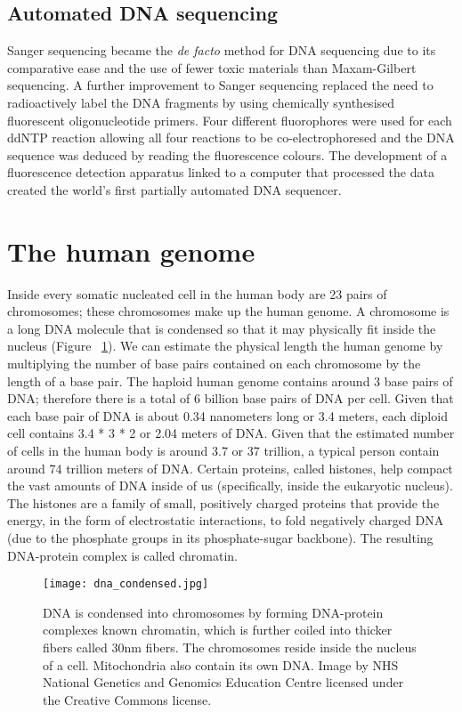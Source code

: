 \subsection{Automated DNA sequencing}

Sanger sequencing became the \textit{de facto} method for DNA sequencing due to its comparative ease and the use of fewer toxic materials than Maxam-Gilbert sequencing. A further improvement to Sanger sequencing replaced the need to radioactively label the DNA fragments by using chemically synthesised fluorescent oligonucleotide primers\cite{pmid3713851}. Four different fluorophores were used for each ddNTP reaction allowing all four reactions to be co-electrophoresed and the DNA sequence was deduced by reading the fluorescence colours. The development of a fluorescence detection apparatus linked to a computer that processed the data created the world's first partially automated DNA sequencer\cite{pmid3713851}.

\section{The human genome}

Inside every somatic nucleated cell in the human body are 23 pairs of chromosomes; these chromosomes make up the human genome. A chromosome is a long DNA molecule that is condensed so that it may physically fit inside the nucleus (Figure ~\ref{fig:dna_condensed}). We can estimate the physical length the human genome by multiplying the number of base pairs contained on each chromosome by the length of a base pair. The haploid human genome contains around 3 base pairs of DNA; therefore there is a total of 6 billion base pairs of DNA per cell. Given that each base pair of DNA is about 0.34 nanometers long or 3.4 meters\cite{pmid7354864}, each diploid cell contains 3.4 * 3 * 2 or 2.04 meters of DNA. Given that the estimated number of cells in the human body is around 3.7 or 37 trillion\cite{pmid23829164}, a typical person contain around 74 trillion meters of DNA. Certain proteins, called histones, help compact the vast amounts of DNA inside of us (specifically, inside the eukaryotic nucleus). The histones are a family of small, positively charged proteins that provide the energy, in the form of electrostatic interactions, to fold negatively charged DNA (due to the phosphate groups in its phosphate-sugar backbone). The resulting DNA-protein complex is called chromatin.

\begin{figure}[h]
   \centering
   \texttt{[image: dna\_condensed.jpg]}
   \caption[Condensation of DNA]{DNA is condensed into chromosomes by forming DNA-protein complexes known chromatin, which is further coiled into thicker fibers called 30nm fibers. The chromosomes reside inside the nucleus of a cell. Mitochondria also contain its own DNA. Image by NHS National Genetics and Genomics Education Centre licensed under the Creative Commons license.}
   \label{fig:dna_condensed}
\end{figure}

